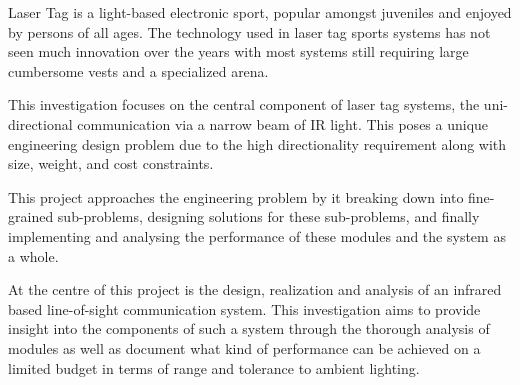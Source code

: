 Laser Tag is a light-based electronic sport, popular amongst juveniles and enjoyed by persons of all ages. The technology used in laser tag sports systems has not seen much innovation over the years with most systems still requiring large cumbersome vests and a specialized arena.

This investigation focuses on the central component of laser tag systems, the uni-directional communication via a narrow beam of IR light. This poses a unique engineering design problem due to the high directionality requirement along with size, weight, and cost constraints.

This project approaches the engineering problem by it breaking down into fine-grained sub-problems, designing solutions for these sub-problems, and finally implementing and analysing the performance of these modules and the system as a whole.

At the centre of this project is the design, realization and analysis of an infrared based line-of-sight communication system. This investigation aims to provide insight into the components of such a system through the thorough analysis of modules as well as document what kind of performance can be achieved on a limited budget in terms of range and tolerance to ambient lighting.





\iffalse
Your abstract provides a good idea of where the project is going, however it's missing your key findings and conclusion. An abstract is a highly condensed summary of the entire project and usually follows the following format: intro and problem, project aim, methods, key findings and conclusion.

The abstract is usually the most difficult part to write because of how condensed it needs to be. If you need inspiration, have a look at the abstracts of relevant journal articles :)
\fi
